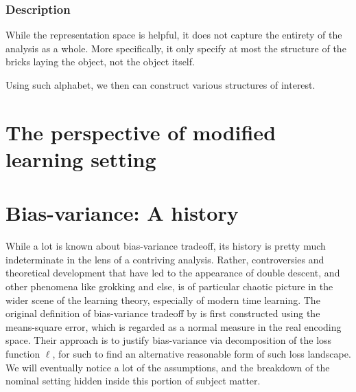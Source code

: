 \subsubsection{Description}

While the representation space is helpful, it does not capture the entirety of the analysis as a whole. More specifically, it only specify at most the structure of the bricks laying the object, not the object itself. 

Using such alphabet, we then can construct various structures of interest. 

\section{The perspective of modified learning setting}



\clearpage

\section{Bias-variance: A history}
While a lot is known about bias-variance tradeoff, its history is pretty much indeterminate in the lens of a contriving analysis. Rather, controversies and theoretical development that have led to the appearance of double descent, and other phenomena like grokking and else, is of particular chaotic picture in the wider scene of the learning theory, especially of modern time learning. The original definition of bias-variance tradeoff by \cite{6797087} is first constructed using the means-square error, which is regarded as a normal measure in the real encoding space. Their approach is to justify bias-variance via decomposition of the loss function $\ell$, for such to find an alternative reasonable form of such loss landscape. We will eventually notice a lot of the assumptions, and the breakdown of the nominal setting hidden inside this portion of subject matter.


